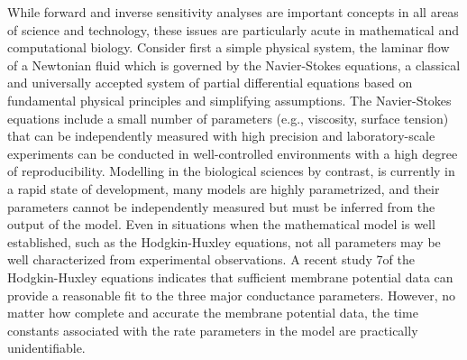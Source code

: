 \documentclass[10pt,letterpaper]{article}
\begin{document}
While forward and inverse sensitivity analyses are important concepts in all areas of science and technology, these issues are particularly acute in mathematical and computational biology. Consider first a simple physical system, the laminar flow of a Newtonian fluid which is governed by the Navier-Stokes equations, a classical and universally accepted system of partial differential equations based on fundamental physical principles and simplifying assumptions. The Navier-Stokes equations include a small number of parameters (e.g., viscosity, surface tension) that can be independently measured with high precision and laboratory-scale experiments can be conducted in well-controlled environments with a high degree of reproducibility. Modelling in the biological sciences by contrast, is currently in a rapid state of development, many models are highly parametrized, and their parameters cannot be independently measured but must be inferred from the output of the model. Even in situations when the mathematical model is well established, such as the Hodgkin-Huxley equations, not all parameters may be well characterized from experimental observations. A recent study 7of the Hodgkin-Huxley equations \cite{DGHC-2018} indicates that sufficient membrane potential data can provide a reasonable fit to the three major conductance parameters. However, no matter how complete and accurate the membrane potential data, the time constants associated with the rate parameters in the model are practically unidentifiable. 
\end{document}
